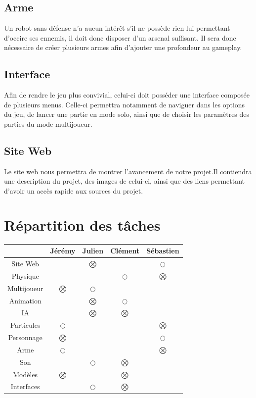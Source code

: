 ﻿\documentclass[12pt]{article}
\begin{document}
\subsection{Arme}
Un robot sans défense n'a aucun intérêt s'il ne possède rien lui permettant d'occire ses ennemis, 
il doit donc disposer d'un arsenal suffisant. Il sera donc nécessaire de créer plusieurs armes
afin d'ajouter une profondeur au gameplay.


\subsection{Interface}
Afin de rendre le jeu plus convivial, celui-ci doit posséder 
une interface composée de plusieurs menus. Celle-ci 
permettra notamment de naviguer dans les options du jeu, de
 lancer une partie en mode solo, ainsi que de choisir les
 paramètres des parties du mode multijoueur.

\newpage\subsection{Site Web}
Le site web nous permettra de montrer l'avancement de notre projet.Il contiendra une description du projet, des images de celui-ci, ainsi
que des liens permettant d'avoir un accès rapide aux sources du projet.

\section{Répartition des tâches}

\begin{tabular}{|c|c|c|c|c|}
\hline
			&	Jérémy		&	Julien		&	Clément		&	Sébastien	\\ \hline
Site Web	&				& $\bigotimes$	& 				& $\bigcirc$	\\ \hline
Physique	&				&				& $\bigcirc$	& $\bigotimes$	\\ \hline
Multijoueur	& $\bigotimes$	& $\bigcirc$	&				& 				\\ \hline
Animation	&				& $\bigotimes$	& $\bigcirc$	&				\\ \hline
IA			& 				& $\bigotimes$	& $\bigotimes$	&				\\ \hline
Particules	& $\bigcirc$	& 				&				& $\bigotimes$	\\ \hline
Personnage	& $\bigotimes$	&				& 				& $\bigcirc$	\\ \hline
Arme		& $\bigcirc$	&				&				& $\bigotimes$	\\ \hline
Son			&				& $\bigcirc$	& $\bigotimes$	&				\\ \hline
Modèles		& $\bigotimes$	&				& $\bigotimes$	&				\\ \hline
Interfaces	& 				& $\bigcirc$	& $\bigotimes$	&				\\ \hline
\end{tabular}
\end{document}
